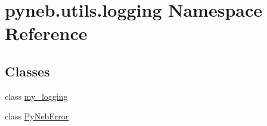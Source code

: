 \hypertarget{namespacepyneb_1_1utils_1_1logging}{}\section{pyneb.\+utils.\+logging Namespace Reference}
\label{namespacepyneb_1_1utils_1_1logging}
\subsection*{Classes}
\begin{DoxyCompactItemize}
\item 
class \hyperlink{classpyneb_1_1utils_1_1logging_1_1my__logging}{my\+\_\+logging}
\item 
class \hyperlink{classpyneb_1_1utils_1_1logging_1_1_py_neb_error}{Py\+Neb\+Error}
\end{DoxyCompactItemize}
